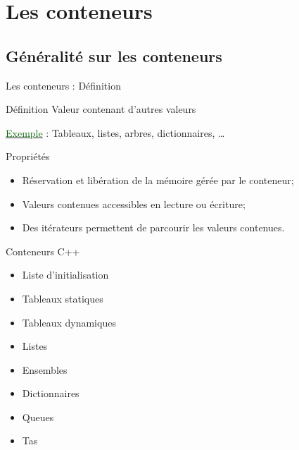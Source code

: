 \documentclass[compress,10pt,aspectratio=169]{beamer}
\begin{document}
\section{Les conteneurs}

\subsection{Généralité sur les conteneurs}

\begin{frame}[fragile]{Les conteneurs : Définition}
\scriptsize
\begin{block}{\small Définition}
Valeur contenant d'autres valeurs
\end{block}
\underline{\textcolor{DarkGreen}{Exemple}} : Tableaux, listes, arbres, dictionnaires, \ldots 

\begin{block}{\small Propriétés}
\begin{itemize}
\item Réservation et libération de la mémoire gérée par le conteneur;
\item Valeurs contenues accessibles en lecture ou écriture;
\item Des itérateurs permettent de parcourir les valeurs contenues.
\end{itemize}
\end{block}

\begin{exampleblock}{\small Conteneurs C++}
\begin{multicols}{3}
\begin{itemize}
\item Liste d'initialisation
\item Tableaux statiques 
\item Tableaux dynamiques
\item Listes
\item Ensembles
\item Dictionnaires 
\item Queues 
\item Tas
\end{itemize}
\end{multicols}
\end{exampleblock}
\end{frame}
\end{document}
